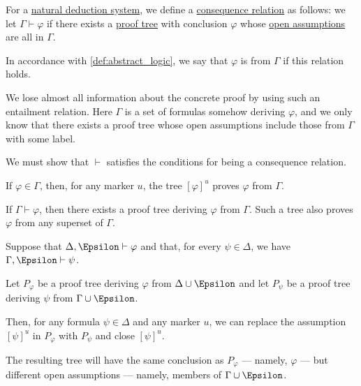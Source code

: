 \begin{definition}\label{def:natural_deduction_entailment}
  For a \hyperref[def:abstract_natural_deduction_system]{natural deduction system}, we define a \hyperref[def:consequence_relation]{consequence relation} as follows: we let \( \Gamma \vdash \varphi \) if there exists a \hyperref[def:propositional_natural_deduction_proof_tree]{proof tree} with conclusion \( \varphi \) whose \hyperref[def:propositional_natural_deduction_proof_tree/open]{open assumptions} are all in \( \Gamma \).

  In accordance with \cref{def:abstract_logic}, we say that \( \varphi \) is  from \( \Gamma \) if this relation holds.
\end{definition}
\begin{comments}
  \item We lose almost all information about the concrete proof by using such an entailment relation. Here \( \Gamma \) is a set of formulas somehow deriving \( \varphi \), and we only know that there exists a proof tree whose open assumptions include those from \( \Gamma \) with some label.
\end{comments}
\begin{defproof}
  We must show that \( {\vdash} \) satisfies the conditions for being a consequence relation.

   If \( \varphi \in \Gamma \), then, for any marker \( u \), the tree \( [\varphi]^u \) proves \( \varphi \) from \( \Gamma \).

   If \( \Gamma \vdash \varphi \), then there exists a proof tree deriving \( \varphi \) from \( \Gamma \). Such a tree also proves \( \varphi \) from any superset of \( \Gamma \).

   Suppose that \( \Delta, \Epsilon \vdash \varphi \) and that, for every \( \psi \in \Delta \), we have \( \Gamma, \Epsilon \vdash \psi \).

  Let \( P_\varphi \) be a proof tree deriving \( \varphi \) from \( \Delta \cup \Epsilon \) and let \( P_\psi \) be a proof tree deriving \( \psi \) from \( \Gamma \cup \Epsilon \).

  Then, for any formula \( \psi \in \Delta \) and any marker \( u \), we can replace the assumption \( [\psi]^u \) in \( P_\varphi \) with \( P_\psi \) and close \( [\psi]^u \).

  The resulting tree will have the same conclusion as \( P_\varphi \) --- namely, \( \varphi \) --- but different open assumptions --- namely, members of \( \Gamma \cup \Epsilon \).
\end{defproof}

